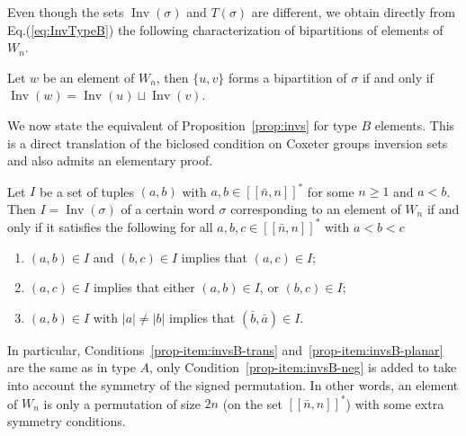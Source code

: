 \documentclass[Unicode]{cedram-alco}
\theoremstyle{definition}
\DeclareMathOperator{\invs}{Inv}
\newcommand{\Bsetnn}{[\![\bar{n},n ]\!]^*}
\begin{document}
Even though the sets $\invs(\sigma)$ and $T(\sigma)$ are different, we obtain directly from Eq.(\ref{eq:InvTypeB}) the following characterization of bipartitions of elements of $W_n$.

\begin{lemm}
\label{lem:B-invsT}
Let $w$ be an element of $W_n$, then $\lbrace u, v \rbrace$ forms a bipartition of $\sigma$ if and only if $\invs(w) = \invs(u)  \sqcup \invs(v)$.
\end{lemm}


We now state the equivalent of Proposition~\ref{prop:invs} for type $B$ elements. This is a direct translation of the biclosed condition on Coxeter groups inversion sets and also admits an elementary proof.

\begin{prop}
\label{prop:invsB}
Let $I$ be a set of tuples $(a,b)$ with $a,b \in \Bsetnn$ for some $n \geq 1$ and $a < b$. Then $I = \invs(\sigma)$ of a certain word $\sigma$ corresponding to an element of $W_n$ if and only if it satisfies the following for all $a,b,c \in \Bsetnn$ with $a < b < c$

\begin{enumerate}
\item $(a,b) \in I$ and $(b,c) \in I$ implies that $(a,c) \in I$;
\label{prop-item:invsB-trans}
\item $(a,c) \in I$ implies that either $(a,b) \in I$, or $(b,c) \in I$;
\label{prop-item:invsB-planar}
\item $(a,b) \in I$ with $|a| \neq |b|$ implies that $(\bar b,  \bar a) \in I$.
\label{prop-item:invsB-neg}
\end{enumerate}
\end{prop}

In particular, Conditions~\eqref{prop-item:invsB-trans} and~\eqref{prop-item:invsB-planar} are the same as in type $A$, only Condition~\eqref{prop-item:invsB-neg} is added to take into account the symmetry of the signed permutation. In other words, an element of $W_n$ is only a permutation of size $2n$ (on the set $\Bsetnn$) with some extra symmetry conditions. 
\end{document}
